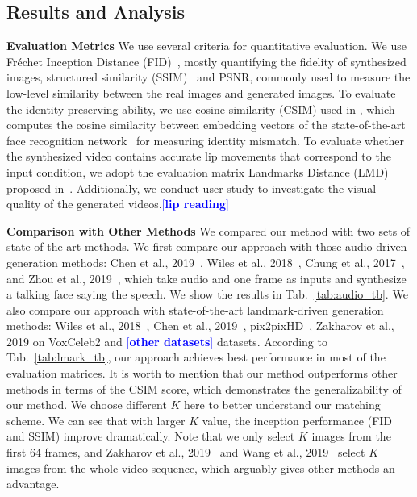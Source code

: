 \documentclass[runningheads]{llncs}
\providecommand{\lchen}[1]{\textcolor{blue}{[{\bf #1}]}}
\begin{document}
\subsection{Results and Analysis}
\label{subsec:quanti_res}
\noindent \textbf{Evaluation Metrics} \quad We use several criteria for quantitative evaluation. We use Fréchet Inception Distance (FID)~\cite{heusel2017gans}, mostly quantifying the fidelity of synthesized images, structured similarity (SSIM)~\cite{wang2004image} and PSNR, commonly used to measure the low-level similarity between the real images and generated images. To evaluate the identity preserving ability, we use cosine similarity ({{CSIM}}) used in \cite{zakharov2019few}, which computes the cosine similarity between embedding vectors of the state-of-the-art face recognition network~\cite{deng2019arcface} for measuring identity mismatch. To evaluate whether the synthesized video contains accurate lip movements that correspond to the input condition, we adopt the evaluation matrix Landmarks Distance (LMD) proposed in~\cite{chen2018lip}. Additionally, we conduct user study to investigate the visual quality of the generated videos.{\lchen{lip reading}}




\noindent \textbf{Comparison with Other Methods} \quad We compared our method with two sets of state-of-the-art methods. We first compare our approach with those audio-driven generation methods: Chen et al., 2019~\cite{chen2019hierarchical}, Wiles et al., 2018~\cite{wiles2018x2face}, Chung et al., 2017~\cite{chung2017you}, and Zhou et al., 2019~\cite{zhou2019talking}, which take audio and one frame as inputs and synthesize a talking face saying the speech. We show the results in Tab.~\ref{tab:audio_tb}.
We also compare our approach with state-of-the-art landmark-driven generation methods: Wiles et al., 2018~\cite{wiles2018x2face}, Chen et al., 2019~\cite{chen2019hierarchical}, pix2pixHD~\cite{wang2018high},  Zakharov et al., 2019\cite{zakharov2019few} on VoxCeleb2 and \lchen{other datasets} datasets. According to Tab.~\ref{tab:lmark_tb}, our approach achieves best performance in most of the evaluation matrices. It is worth to mention that our method outperforms other methods in terms of the CSIM score, which demonstrates the generalizability of our method. We choose different $K$ here to better understand our matching scheme. We can see that with larger $K$ value, the inception performance (FID and SSIM) improve dramatically. Note that we only select $K$ images from the first 64 frames, and  Zakharov et al., 2019~\cite{zakharov2019few} and  Wang et al., 2019~\cite{wang2018fewshotvid2vid} select $K$ images from the whole video sequence, which arguably gives other methods an advantage. 
\end{document}
